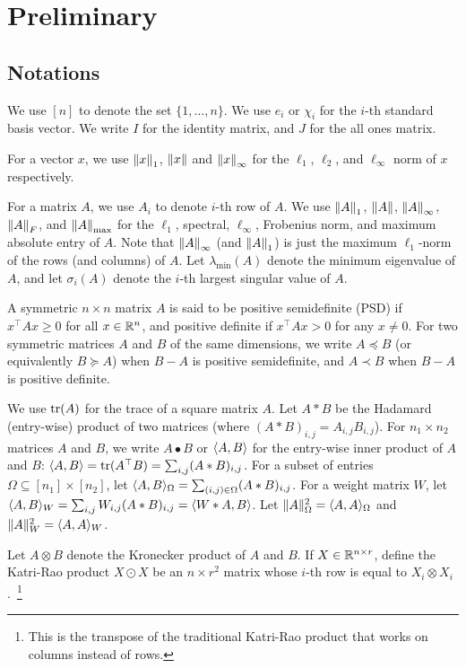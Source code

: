 
\section{Preliminary}
\label{sec:prelim}

\subsection{Notations}
We use $[n]$ to denote the set $\{1, \ldots, n\}$.
We use $e_i$ or $\chi_i$ for the $i$-th standard basis vector.
We write $I$ for the identity matrix, and $J$ for the all ones matrix.

For a vector $x$, we use ${\lVert x{\rVert}}_1$, $\lVert x{\rVert}$ and ${\lVert x{\rVert}}_\infty$ for the $\ell_1$, $\ell_2$, and $\ell_\infty$ norm of $x$ respectively.

For a matrix $A$, we use $A_i$ to denote $i$-th row of $A$.
We use ${\lVert A{\rVert}}_1$, $\lVert A{\rVert}$, ${\lVert A{\rVert}}_\infty$, ${\lVert A{\rVert}}_F$, and ${\lVert A{\rVert}}_{\max}$ for the $\ell_1$, spectral, $\ell_\infty$, Frobenius norm, and maximum absolute entry of $A$. Note that ${\lVert A{\rVert}}_\infty$ (and ${\lVert A{\rVert}}_1$) is just the maximum $\ell_1$-norm of the rows (and columns) of $A$.
Let $\lambda_{\min}(A)$ denote the minimum eigenvalue of $A$, and let $\sigma_i(A)$ denote the $i$-th largest singular value of $A$.

A symmetric $n \times n$ matrix $A$ is said to be positive semidefinite (PSD) if $x^\top A x \ge 0$ for all $x \in \mathbb{R}^n$,
and positive definite if $x^\top A x > 0$ for any $x \neq 0$.
For two symmetric matrices $A$ and $B$ of the same dimensions, we write $A \preceq B$ (or equivalently $B \succeq A$) when $B - A$ is positive semidefinite, and $A \prec B$ when $B - A$ is positive definite.

We use $\operatorname{tr}(A)$ for the trace of a square matrix $A$.
Let $A*B$ be the Hadamard (entry-wise) product of two matrices (where $(A*B)_{i,j} = A_{i,j}B_{i,j}$).
For $n_1 \times n_2$ matrices $A$ and $B$, we write $A \bullet B$ or $\langle A, B\rangle$ for the entry-wise inner product of $A$ and $B$: $\langle A, B\rangle = \operatorname{tr}(A^\top B) = \sum_{i,j} (A*B)_{i,j}$.
For a subset of entries $\Omega \subseteq [n_1] \times [n_2]$, let $\langle A,B\rangle_\Omega = \sum_{(i,j)\in \Omega} (A*B)_{i,j}$.
For a weight matrix $W$, let $\langle A,B\rangle_W = \sum_{i,j} W_{i,j} (A*B)_{i,j} = \langle W * A, B\rangle$.
Let $\|A\|_\Omega^2 = \langle A,A\rangle_\Omega$ and $\|A\|_W^2 = \langle A,A\rangle_W$.

Let $A \otimes B$ denote the Kronecker product of $A$ and $B$.
If $X\in \mathbb{R}^{n\times r}$, define the Katri-Rao product $X\odot X$ be an $n\times r^2$ matrix whose $i$-th row is equal to $X_i\otimes X_i$.~\footnote{This is the transpose of the traditional Katri-Rao product that works on columns instead of rows.} 

